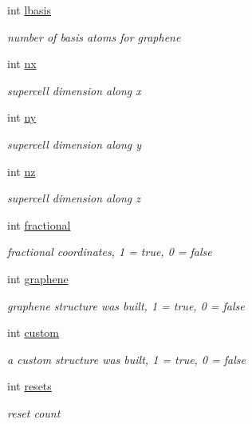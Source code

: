 \begin{DoxyCompactItemize}
int \hyperlink{class_reader_afd2686bb2f2f9eec9601287385d7159e}{lbasis}
\begin{DoxyCompactList}\small\item\em number of basis atoms for graphene \end{DoxyCompactList}\item 
int \hyperlink{class_reader_a85d35ff338db8e5915d7620a730df6fb}{nx}
\begin{DoxyCompactList}\small\item\em supercell dimension along x \end{DoxyCompactList}\item 
int \hyperlink{class_reader_a68ce806c514dd9323b66de3ca25285c2}{ny}
\begin{DoxyCompactList}\small\item\em supercell dimension along y \end{DoxyCompactList}\item 
int \hyperlink{class_reader_ab09026e1e834afa843386f8da4f3e5d3}{nz}
\begin{DoxyCompactList}\small\item\em supercell dimension along z \end{DoxyCompactList}\item 
int \hyperlink{class_reader_a913c9024181fd0fbb2dea5265fa097c1}{fractional}
\begin{DoxyCompactList}\small\item\em fractional coordinates, 1 = true, 0 = false \end{DoxyCompactList}\item 
int \hyperlink{class_reader_aa0c8ca660b7982ecc0fcaa673a1db16b}{graphene}
\begin{DoxyCompactList}\small\item\em graphene structure was built, 1 = true, 0 = false \end{DoxyCompactList}\item 
int \hyperlink{class_reader_aeffa187da9ac5feb5c3e5e078fe43fde}{custom}
\begin{DoxyCompactList}\small\item\em a custom structure was built, 1 = true, 0 = false \end{DoxyCompactList}\item 
int \hyperlink{class_reader_a3a38a2290db448491a46a74ca4413c71}{resets}
\begin{DoxyCompactList}\small\item\em reset count \end{DoxyCompactList}\item 

\end{DoxyCompactItemize}
